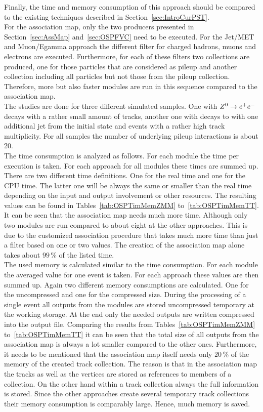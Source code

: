 Finally, the time and memory consumption of this approach should be compared to the existing techniques described in Section~\ref{sec:IntroCurPST}. \\
For the association map, only the two producers presented in Section~\ref{sec:AssMap} and~\ref{sec:OSPFVC} need to be executed. For the Jet/MET and Muon/Egamma approach the different filter for charged hadrons, muons and electrons are executed. Furthermore, for each of these filters two collections are produced, one for those particles that are considered as pileup and another collection including all particles but not those from the pileup collection. Therefore, more but also faster modules are run in this sequence compared to the association map. \\
The studies are done for three different simulated samples. One with ${Z^{0}}\rightarrow e^+e^-$ decays with a rather small amount of tracks, another one with \Zz decays to \MM with one additional jet from the initial state and \ttbar events with a rather high track multiplicity. For all samples the number of underlying pileup interactions is about 20. \\
The time consumption is analyzed as follows. For each module the time per execution is taken. For each approach for all modules these times are summed up. There are two different time definitions. One for the real time and one for the CPU time. The latter one will be always the same or smaller than the real time depending on the input and output involvement or other resources. The resulting values can be found in Tables~\ref{tab:OSPTimMemZMM} to~\ref{tab:OSPTimMemTT}. It can be seen that the association map needs much more time. Although only two modules are run compared to about eight at the other approaches. This is due to the customized association procedure that takes much more time than just a filter based on one or two values. The creation of the association map alone takes about $99\,\%$ of the listed time. \\
The used memory is calculated similar to the time consumption. For each module the averaged value for one event is taken. For each approach these values are then summed up. Again two different memory consumptions are calculated. One for the uncompressed and one for the compressed size. During the processing of a single event all outputs from the modules are stored uncompressed temporary at the working storage. At the end only the needed outputs are written compressed into the output file. Comparing the results from Tables~\ref{tab:OSPTimMemZMM} to~\ref{tab:OSPTimMemTT} it can be seen that the total size of all outputs from the association map is always a lot smaller compared to the other ones. Furthermore, it needs to be mentioned that the association map itself needs only $20\,\%$ of the memory of the created track collection. The reason is that in the association map the tracks as well as the vertices are stored as references to members of a collection. On the other hand within a track collection always the full information is stored. Since the other approaches create several temporary track collections their memory consumption is comparably large. Hence, much memory is saved.



